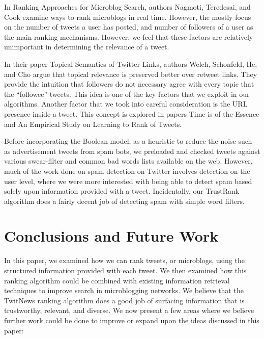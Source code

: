 \documentclass[10pt]{proc}
\begin{document}
In Ranking Approaches for Microblog Search, authors Nagmoti, Teredesai, and Cook examine ways to rank microblogs in real time. However, the mostly focus on the number of tweets a user has posted, and number of followers of a user as the main ranking mechanisms\cite{microblog_ranking}. However, we feel that these factors are relatively unimportant in determining the relevance of a tweet.

In their paper Topical Semantics of Twitter Links\cite{Twitter_semantics}, authors Welch, Schonfeld, He, and Cho argue that topical relevance is preserved better over retweet links. They provide the intuition that followers do not necessary agree with every topic that the ``followee'' tweets. This idea is one of the key factors that we exploit in our algorithms. Another factor that we took into careful consideration is the URL presence inside a tweet. This concept is explored in papers Time is of the Essence\cite{recency_ranking} and An Empirical Study on Learning to Rank of Tweets\cite{rank_of_tweets}.

Before incorporating the Boolean model, as a heuristic to reduce the noise such as advertisement tweets from spam bots, we preloaded and checked tweets against various swear-filter and common bad words lists available on the web.  However, much of the work done on spam detection on Twitter involves detection on the user level, where we were more interested with being able to detect spam based solely upon information provided with a tweet. Incidentally, our TrustRank algorithm does a  fairly decent job of detecting spam with simple word filters.

\section{Conclusions and Future Work}
In this paper, we examined how we can rank tweets, or microblogs, using the structured information provided with each tweet. We then examined how this ranking algorithm could be combined with existing information retrieval techniques to improve search in microblogging networks. We believe that the TwitNews ranking algorithm does a good job of surfacing information that is trustworthy, relevant, and diverse. We now present a few areas where we believe further work could be done to improve or expand upon the ideas discussed in this paper:
\end{document}
